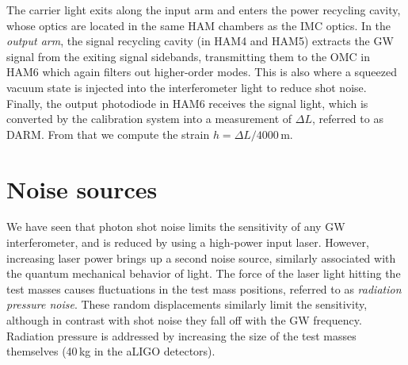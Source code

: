 The carrier light exits along the input arm and enters the power recycling cavity, whose optics are located in the same \ac{HAM} chambers as the \ac{IMC} optics.
In the \textit{output arm}, the signal recycling cavity (in HAM4 and HAM5) extracts the GW signal from the exiting signal sidebands, transmitting them to the \ac{OMC} in HAM6 which again filters out higher-order modes.
This is also where a squeezed vacuum state is injected into the interferometer light to reduce shot noise.
Finally, the output photodiode in HAM6 receives the signal light, which is converted by the calibration system into a measurement of $\Delta L$, referred to as \ac{DARM}.
From that we compute the strain $h = \Delta L / 4000$\,m.


\section{Noise sources}\label{sec:noise-sources}

We have seen that photon shot noise limits the sensitivity of any GW interferometer, and is reduced by using a high-power input laser.
However, increasing laser power brings up a second noise source, similarly associated with the quantum mechanical behavior of light.
The force of the laser light hitting the test masses causes fluctuations in the test mass positions, referred to as \textit{radiation pressure noise}.
These random displacements similarly limit the sensitivity, although in contrast with shot noise they fall off with the GW frequency.
Radiation pressure is addressed by increasing the size of the test masses themselves (40\,kg in the aLIGO detectors).

